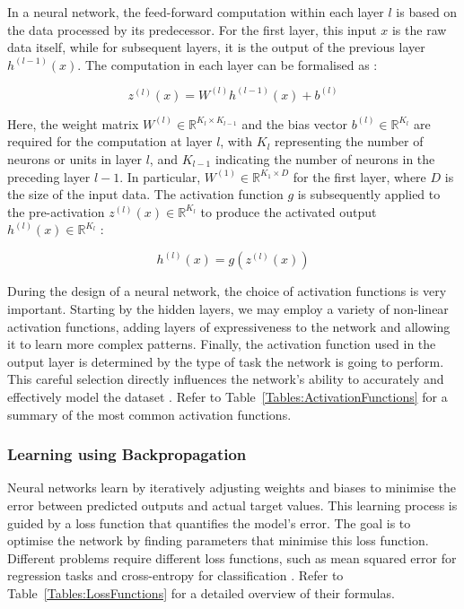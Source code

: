 In a neural network, the feed-forward computation within each layer \( l \) is based on the data processed by its predecessor. For the first layer, this input \( x \) is the raw data itself, while for subsequent layers, it is the output of the previous layer \( h^{(l-1)}(x) \). The computation in each layer can be formalised as \cite{goodfellow_deep_2016}:

\begin{equation}
z^{(l)}(x) = W^{(l)} h^{(l-1)}(x) + b^{(l)}
\end{equation}

Here, the weight matrix \( W^{(l)} \in \mathbb{R}^{K_l \times K_{l-1}} \) and the bias vector \( b^{(l)} \in \mathbb{R}^{K_l} \) are required for the computation at layer \( l \), with \( K_l \) representing the number of neurons or units in layer \( l \), and \( K_{l-1} \) indicating the number of neurons in the preceding layer \( l-1 \). In particular, \( W^{(1)} \in \mathbb{R}^{K_1 \times D} \) for the first layer, where \( D \) is the size of the input data. The activation function \( g \) is subsequently applied to the pre-activation \( z^{(l)}(x) \in \mathbb{R}^{K_l} \) to produce the activated output \( h^{(l)}(x) \in \mathbb{R}^{K_l} \) \cite{goodfellow_deep_2016}:

\begin{equation}
h^{(l)}(x) = g(z^{(l)}(x))
\end{equation}

During the design of a neural network, the choice of activation functions is very important. Starting by the hidden layers, we may employ a variety of non-linear activation functions, adding layers of expressiveness to the network and allowing it to learn more complex patterns. Finally, the activation function used in the output layer is determined by the type of task the network is going to perform. This careful selection directly influences the network's ability to accurately and effectively model the dataset \cite{goodfellow_deep_2016}. Refer to Table~\ref{Tables:ActivationFunctions} for a summary of the most common activation functions.



\subsubsection{Learning using Backpropagation}

Neural networks learn by iteratively adjusting weights and biases to minimise the error between predicted outputs and actual target values. This learning process is guided by a loss function that quantifies the model's error. The goal is to optimise the network by finding parameters that minimise this loss function. Different problems require different loss functions, such as mean squared error for regression tasks and cross-entropy for classification \cite{goodfellow_deep_2016}. Refer to Table~\ref{Tables:LossFunctions} for a detailed overview of their formulas.

